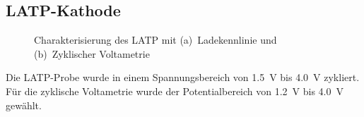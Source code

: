 \documentclass[a4paper, 11pt, headsepline,footsepline,twoside,abstract]{scrbook}
\begin{document}
\subsection{LATP-Kathode}
\begin{figure}[b!]
   \centering
       \vspace{3mm}
       \vspace{3mm}
	\caption{Charakterisierung des LATP mit (a)~Ladekennlinie und (b)~Zyklischer Voltametrie}
   	\label{ec_LATP}
\end{figure}
Die LATP-Probe wurde in einem Spannungsbereich von \SI{1.5}{\volt} bis \SI{4.0}{\volt} zykliert. Für die zyklische Voltametrie wurde der Potentialbereich von \SI{1.2}{\volt} bis \SI{4.0}{\volt} gewählt.
\end{document}
